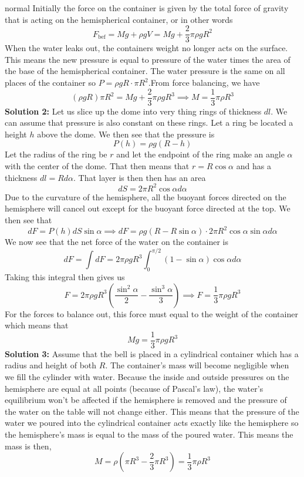 \begin{solution}{normal}
Initially the force on the container is given by the total force of gravity that is acting on the hemispherical container, or in other words
\[F_{\text{bef}} = Mg + \rho gV = Mg + \frac{2}{3}\pi\rho gR^2\]When the water leaks out, the containers weight no longer acts on the surface. This means the new pressure is equal to pressure of the water times the area of the base of the hemispherical container. The water pressure is the same on all places of the container so $P=\rho gR\cdot \pi R^2$.From force balancing, we have
$$(\rho g R)\pi R^2=Mg+\frac{2}{3}\pi\rho gR^3 \implies \boxed{M=\frac{1}{3}\pi\rho R^3}$$
\tcbline
\textbf{Solution 2:} Let us slice up the dome into very thing rings of thickness $dl$. We can assume that pressure is also constant on these rings. Let a ring be located a height $h$ above the dome. We then see that the pressure is
\[P(h) = \rho g(R - h)\]Let the radius of the ring be $r$ and let the endpoint of the ring make an angle $\alpha$ with the center of the dome. That then means that $r = R\cos\alpha$ and has a thickness $dl = Rd\alpha$. That layer is then then has an area
\[dS = 2\pi R^2\cos\alpha d\alpha\]Due to the curvature of the hemisphere, all the buoyant forces directed on the hemisphere will cancel out except for the buoyant force directed at the top. We then see that
\[dF = P(h)dS\sin\alpha\implies dF = \rho g (R-R\sin\alpha)\cdot 2\pi R^2\cos\alpha\sin\alpha d\alpha\]We now see that the net force of the water on the container is
\[dF = \int dF = 2\pi\rho gR^3\int_{0}^{\pi/2} (1-\sin\alpha)\cos\alpha d\alpha\]Taking this integral then gives us
\[F = 2\pi\rho gR^3\left(\frac{\sin^2\alpha}{2} - \frac{\sin^3\alpha}{3}\right)\implies F = \frac{1}{3}\pi\rho g R^3\]For the forces to balance out, this force must equal to the weight of the container which means that
\[Mg = \boxed{\frac{1}{3}\pi\rho g R^3}\]
\tcbline 
\textbf{Solution 3:} Assume that the bell is placed in a cylindrical container which has a radius and height of both $R$. The container's mass will become negligible when we fill the cylinder with water. Because the inside and outside pressures on the hemisphere are equal at all points (because of Pascal's law), the water's equilibrium won't be affected if the hemisphere is removed and the pressure of the water on the table will not change either. This means that the pressure of the water we poured into the cylindrical container acts exactly like the hemisphere so the hemisphere's mass is equal to the mass of the poured water. This means the mass is then,
\[M = \rho\left(\pi R^3 - \frac{2}{3}\pi R^3\right) = \boxed{\frac{1}{3}\pi\rho R^3}\]
\end{solution}
